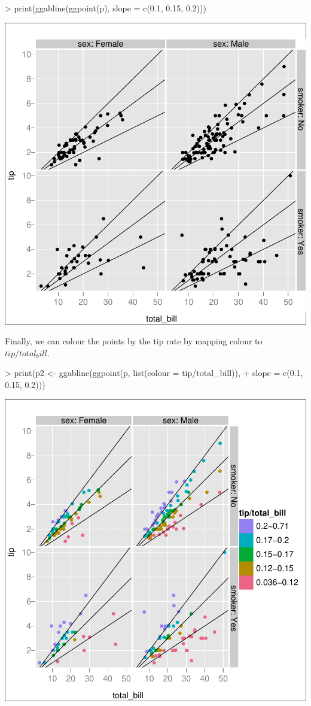 \documentclass[]{article}
\begin{document}
\begin{Schunk}
\begin{Sinput}
> print(ggabline(ggpoint(p), slope = c(0.1, 0.15, 0.2)))
\end{Sinput}
\end{Schunk}
\includegraphics{introduction-008}

Finally, we can colour the points by the tip rate by mapping colour to $tip / total_bill$.  

\begin{Schunk}
\begin{Sinput}
> print(p2 <- ggabline(ggpoint(p, list(colour = tip/total_bill)), 
+     slope = c(0.1, 0.15, 0.2)))
\end{Sinput}
\end{Schunk}
\includegraphics{introduction-009}
\end{document}
